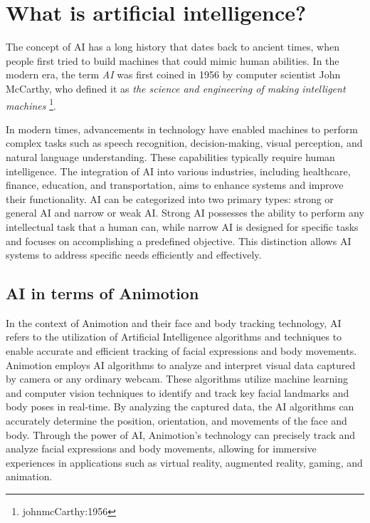 \section{What is artificial intelligence?}
The concept of AI has a long history that dates back to ancient times,
when people first tried to build machines that could mimic human abilities.
In the modern era, the term \textit{AI}  was first coined in 1956 by computer scientist 
John McCarthy, who defined it as \textit{the science and engineering of making 
intelligent machines} \footnote{johnmcCarthy:1956}.

In modern times, advancements in technology have enabled machines to perform complex tasks such as speech recognition, 
decision-making, visual perception, and natural language understanding. These capabilities typically require human 
intelligence. The integration of AI into various industries, including healthcare, finance, 
education, and transportation, aims to enhance systems and improve their functionality. 
AI can be categorized into two primary types: strong or general AI and narrow or weak AI. 
Strong AI possesses the ability to perform any intellectual task that a human can, while narrow 
AI is designed for specific tasks and focuses on accomplishing a predefined objective. 
This distinction allows AI systems to address specific needs efficiently and effectively. \cite{KindsOfAI}

\subsection{AI in terms of Animotion}
In the context of Animotion and their face and body tracking technology, AI refers to the utilization of Artificial Intelligence algorithms 
and techniques to enable accurate and efficient tracking of facial expressions and body movements.
Animotion employs AI algorithms to analyze and interpret visual data captured by camera or any ordinary webcam. These algorithms utilize machine learning and 
computer vision techniques to identify and track key facial landmarks and body poses in real-time. By analyzing the captured data, the 
AI algorithms can accurately determine the position, orientation, and movements of the face and body.
Through the power of AI, Animotion's technology can precisely track and analyze facial expressions and body movements, allowing for 
immersive experiences in applications such as virtual reality, augmented reality, gaming, and animation.

